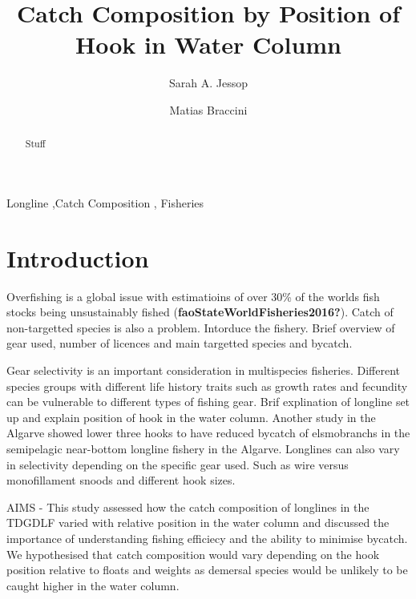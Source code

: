 \documentclass[preprint, 3p,
authoryear]{elsarticle} %
\begin{document}
\begin{frontmatter}

  \title{Catch Composition by Position of Hook in Water Column}
    \author[Department of Primary Industries and Regional
Development]{Sarah A. Jessop%
  }
    \author[Department of Primary Industries and Regional
Development]{Matias Braccini%
  }
  
  \begin{abstract}
  Stuff
  \end{abstract}
    \begin{keyword}
    Longline \sep Catch Composition \sep 
    Fisheries
  \end{keyword}
  
 \end{frontmatter}

\hypertarget{introduction}{%
\section{Introduction}\label{introduction}}

Overfishing is a global issue with estimatioins of over 30\% of the
worlds fish stocks being unsustainably fished
(\textbf{faoStateWorldFisheries2016?}). Catch of non-targetted species
is also a problem. Intorduce the fishery. Brief overview of gear used,
number of licences and main targetted species and bycatch.

Gear selectivity is an important consideration in multispecies
fisheries. Different species groups with different life history traits
such as growth rates and fecundity can be vulnerable to different types
of fishing gear. Brif explination of longline set up and explain
position of hook in the water column. Another study in the Algarve
showed lower three hooks to have reduced bycatch of elsmobranchs in the
semipelagic near-bottom longline fishery in the Algarve. Longlines can
also vary in selectivity depending on the specific gear used. Such as
wire versus monofillament snoods and different hook sizes.

AIMS - This study assessed how the catch composition of longlines in the
TDGDLF varied with relative position in the water column and discussed
the importance of understanding fishing efficiecy and the ability to
minimise bycatch. We hypothesised that catch composition would vary
depending on the hook position relative to floats and weights as
demersal species would be unlikely to be caught higher in the water
column.
\end{document}
